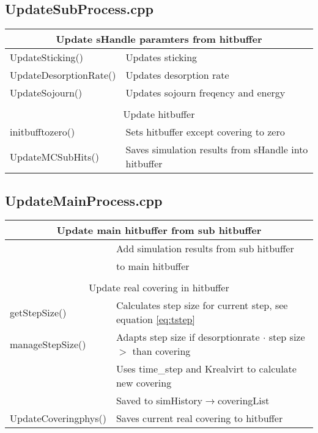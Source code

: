 \subsection{UpdateSubProcess.cpp}

\begin{center}
\begin{tabular}{|l|l|}
\hline
\multicolumn{2}{|c|}{\rule{0pt}{3ex}Update sHandle paramters from hitbuffer}\\
\hline
\rule{0pt}{3ex} UpdateSticking()& Updates sticking\\
\rule{0pt}{3ex} UpdateDesorptionRate()& Updates desorption rate \\
\rule{0pt}{3ex} UpdateSojourn()& Updates sojourn freqency and energy \\
\hline
\multicolumn{2}{l}{}\\[1ex]
\hline
\multicolumn{2}{|c|}{\rule{0pt}{3ex}Update hitbuffer}\\
\hline
\rule{0pt}{3ex} initbufftozero()& Sets hitbuffer except covering to zero\\
\rule{0pt}{3ex} UpdateMCSubHits()& Saves simulation results from sHandle into hitbuffer\\
\hline
\end{tabular}
\end{center}
\newpage
\subsection{UpdateMainProcess.cpp}
\begin{center}
\begin{tabular}{|l|l|}
\hline
\multicolumn{2}{|c|}{\rule{0pt}{3ex}Update main hitbuffer from sub hitbuffer}\\
\hline
\rule{0pt}{3ex}  \multirow{2}{*}{UpdateMCMainHits()}& Add simulation results from sub hitbuffer\\& to main hitbuffer\\
\hline
\multicolumn{2}{l}{}\\[1ex]
\hline
\multicolumn{2}{|c|}{\rule{0pt}{3ex}Update real covering in hitbuffer}\\
\hline
\rule{0pt}{3ex} getStepSize()& Calculates step size for current step, see equation \ref{eq:tstep}\\
\rule{0pt}{3ex} {manageStepSize()}&  Adapts step size if desorptionrate $\cdot$ step size $>$ than covering\\
\rule{0pt}{3ex} \multirow{2}{*}{UpdateCovering()}& Uses time\_step and Krealvirt to calculate new covering\\
& Saved to simHistory$\rightarrow$coveringList\\
\rule{0pt}{3ex} UpdateCoveringphys()& Saves current real covering to hitbuffer\\
\hline
\end{tabular}
\end{center}

